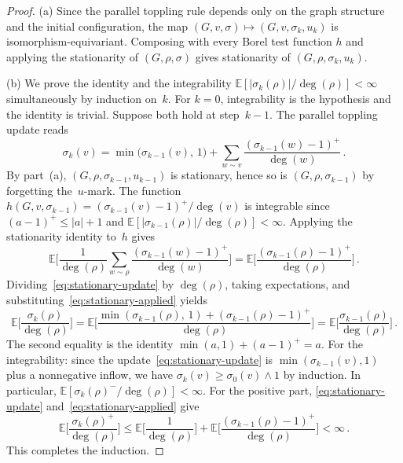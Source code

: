 \documentclass[aop]{imsart}
\theoremstyle{plain}
\theoremstyle{definition}
\newcommand{\E}{\mathbb{E}}
\begin{document}
	\begin{proof}
		(a) Since the parallel toppling rule depends only on the graph structure and the initial configuration, the map $(G,v,\sigma)\mapsto(G,v,\sigma_k,u_k)$ is isomorphism-equivariant. Composing with every Borel test function $h$ and applying the stationarity of $(G,\rho,\sigma)$ gives stationarity of $(G,\rho,\sigma_k,u_k)$.
		
		\medskip
		
		(b) We prove the identity and the integrability $\E[|\sigma_k(\rho)|/\deg(\rho)]<\infty$ simultaneously by induction on~$k$. For $k=0$, integrability is the hypothesis and the identity is trivial. Suppose both hold at step~$k-1$. The parallel toppling update reads
		\begin{equation}\label{eq:stationary-update}
			\sigma_k(v) = \min\bigl(\sigma_{k-1}(v),\,1\bigr) + \sum_{w \sim v} \frac{(\sigma_{k-1}(w)-1)^+}{\deg(w)}\,.
		\end{equation}
		By part~(a), $(G,\rho,\sigma_{k-1},u_{k-1})$ is stationary, hence so is $(G,\rho,\sigma_{k-1})$ by forgetting the~$u$-mark. The function $h(G,v,\sigma_{k-1}) = (\sigma_{k-1}(v)-1)^+/\deg(v)$ is integrable since $(a-1)^+\leq|a|+1$ and $\E[|\sigma_{k-1}(\rho)|/\deg(\rho)]<\infty$. Applying the stationarity identity to~$h$ gives
		\begin{equation}\label{eq:stationary-applied}
			\E\biggl[\frac{1}{\deg(\rho)}\sum_{w \sim \rho} \frac{(\sigma_{k-1}(w)-1)^+}{\deg(w)}\biggr] = \E\biggl[\frac{(\sigma_{k-1}(\rho)-1)^+}{\deg(\rho)}\biggr]\,.
		\end{equation}
		Dividing~\eqref{eq:stationary-update} by $\deg(\rho)$, taking expectations, and substituting~\eqref{eq:stationary-applied} yields
		\[
		\E\biggl[\frac{\sigma_k(\rho)}{\deg(\rho)}\biggr] = \E\biggl[\frac{\min(\sigma_{k-1}(\rho),\,1) + (\sigma_{k-1}(\rho)-1)^+}{\deg(\rho)}\biggr] = \E\biggl[\frac{\sigma_{k-1}(\rho)}{\deg(\rho)}\biggr]\,.
		\]
		The second equality is the identity $\min(a,1) + (a-1)^+ = a$. For the integrability: since the update~\eqref{eq:stationary-update} is $\min(\sigma_{k-1}(v),1)$ plus a nonnegative inflow, we have $\sigma_k(v) \geq \sigma_0(v) \wedge 1$ by induction. In particular, $\E[\sigma_k(\rho)^-/\deg(\rho)] < \infty$. For the positive part, \eqref{eq:stationary-update} and~\eqref{eq:stationary-applied} give
		\[
		\E\biggl[\frac{\sigma_k(\rho)^+}{\deg(\rho)}\biggr] \leq \E\biggl[\frac{1}{\deg(\rho)}\biggr] + \E\biggl[\frac{(\sigma_{k-1}(\rho)-1)^+}{\deg(\rho)}\biggr] < \infty\,.
		\]
		This completes the induction.
	\end{proof}
	
\end{document}
